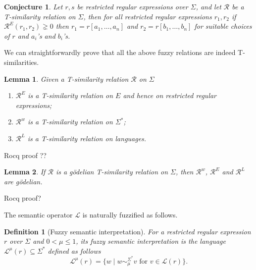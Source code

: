 \documentclass{article}
\newcommand{\cR}{{\mathcal R}}
\def\cut{\mu}
\newtheorem{definition}{Definition}[section]
\newtheorem{lemma}{Lemma}[section]
\newtheorem{conjecture}{Conjecture}[section]
\begin{document}
{\color{red}\begin{conjecture} Let $r,s$ be restricted regular expressions over $\Sigma$, and let $\mathcal{R}$ be a T-similarity relation on $\Sigma$, then for all restricted regular expressions $r_1,r_2$ if $\mathcal{R}^E(r_1,r_2)\gneq 0$ then $r_1=r[a_1,\ldots,a_n] $ and $r_2=r[b_1,\ldots,b_n] $ for suitable choices of $r$ and $a_i$'s and $b_i$'s. 
\end{conjecture}}

We can straightforwardly prove that all the above fuzzy relations are indeed T-similarities.
\begin{lemma} \label{T-similarity}Given a T-similarity relation $\mathcal R$ on $\Sigma$ \begin{enumerate}
\item $\mathcal{R}^{E}$ is a T-similarity relation on $E$ and hence on restricted regular expressions;
\item $\mathcal{R}^w$ is a T-similarity relation on $\Sigma^*$;
\item$\mathcal R^L$ is a T-similarity relation on languages.
\end{enumerate}
\end{lemma}
{\color{red} Rocq proof ??}\vspace{0.5cm}

{\begin{lemma}\label{lem:godelian-transfer}
If $\cR$ is a g\"odelian T-similarity relation on $\Sigma$, then $\cR^w$, $\cR^E$ and $\cR^L$ are g\"odelian.
\end{lemma}}
{\color{red} Rocq proof?}\vspace{0.5cm}

\noindent The semantic operator $\mathcal L$ is naturally fuzzified as follows.
\begin{definition}[Fuzzy semantic interpretation] For a restricted regular expression $r$ over $\Sigma$ and
$0 < \cut \le 1$, its {\em fuzzy semantic interpretation} is the language $\mathcal L^\mu(r)\subseteq \Sigma^{\ast}$ defined as follows 
\[\mathcal L^\mu (r)=\{w\mid w\sim_\mu^{\Sigma^*}v\mbox{ for } v\in \mathcal L(r)\}.\]
\end{definition}
\end{document}
